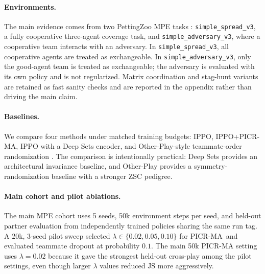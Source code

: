 \documentclass{article}
\newcommand{\method}{PICR-MA}
\newcommand{\JS}{\mathrm{JS}}
\begin{document}
\paragraph{Environments.}
The main evidence comes from two PettingZoo MPE tasks \citep{terry2021pettingzoo}: \texttt{simple\_spread\_v3}, a fully cooperative three-agent coverage task, and \texttt{simple\_adversary\_v3}, where a cooperative team interacts with an adversary. In \texttt{simple\_spread\_v3}, all cooperative agents are treated as exchangeable. In \texttt{simple\_adversary\_v3}, only the good-agent team is treated as exchangeable; the adversary is evaluated with its own policy and is not regularized. Matrix coordination and stag-hunt variants are retained as fast sanity checks and are reported in the appendix rather than driving the main claim.

\paragraph{Baselines.}
We compare four methods under matched training budgets: IPPO, IPPO+\method, IPPO with a Deep Sets encoder, and Other-Play-style teammate-order randomization \citep{schulman2017ppo, terry2020ps, zaheer2017deepsets, hu2020otherplay}. The comparison is intentionally practical: Deep Sets provides an architectural invariance baseline, and Other-Play provides a symmetry-randomization baseline with a stronger ZSC pedigree.

\paragraph{Main cohort and pilot ablations.}
The main MPE cohort uses 5 seeds, 50k environment steps per seed, and held-out partner evaluation from independently trained policies sharing the same run tag. A 20k, 3-seed pilot sweep selected $\lambda \in \{0.02, 0.05, 0.10\}$ for \method\ and evaluated teammate dropout at probability $0.1$. The main 50k PICR-MA setting uses $\lambda=0.02$ because it gave the strongest held-out cross-play among the pilot settings, even though larger $\lambda$ values reduced $\JS$ more aggressively.
\end{document}
